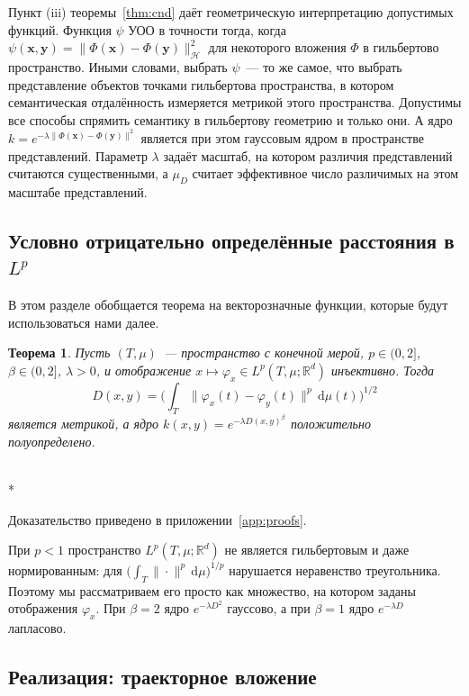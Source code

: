 \documentclass[14pt, a4paper]{extarticle}
\makeatletter
\theoremstyle{definition}
\theoremstyle{plain}
\newtheorem{theorem}[definition]{Теорема}
\renewenvironment{proof}[1][\proofname]{\par
    \pushQED{\qed}%
    \normalfont \topsep6\p@\@plus6\p@\relax
    \trivlist
    \item[\hskip\labelsep\itshape #1\@addpunct{.}]\mbox{}\\*
    \ignorespaces
}{\popQED\endtrivlist\@endpefalse}
\makeatother
\begin{document}
Пункт (iii) теоремы~\ref{thm:cnd} даёт геометрическую интерпретацию допустимых
функций. Функция $\psi$ УОО в точности тогда, когда
$\psi(\mathbf{x},\mathbf{y})=\|\Phi(\mathbf{x})-\Phi(\mathbf{y})\|_{\mathcal{H}}^2$
для некоторого вложения $\Phi$ в гильбертово пространство. Иными словами, выбрать
$\psi$~--- то же самое, что выбрать представление объектов точками гильбертова
пространства, в котором семантическая отдалённость измеряется метрикой этого
пространства. Допустимы все способы спрямить семантику в гильбертову геометрию и
только они. А ядро $k=e^{-\lambda\|\Phi(\mathbf{x})-\Phi(\mathbf{y})\|^2}$ является
при этом гауссовым ядром в пространстве представлений. Параметр $\lambda$ задаёт
масштаб, на котором различия представлений считаются существенными, а $\mu_D$
считает эффективное число различимых на этом масштабе представлений.

\subsection{Условно отрицательно определённые расстояния в \texorpdfstring{$L^p$}{Lp}}
\label{ssec:lp}

В этом разделе обобщается теорема \cite{AlpayMayats2023} на векторозначные
функции, которые будут использоваться нами далее.

\begin{theorem}
\label{thm:lp}
Пусть $(T,\mu)$~--- пространство с конечной мерой, $p\in(0,2]$, $\beta\in(0,2]$, $\lambda>0$, и
отображение $x\mapsto\varphi_x\in L^p(T,\mu;\mathbb{R}^d)$ инъективно. Тогда
\[
    D(x,y)=\Big(\int_T\|\varphi_x(t)-\varphi_y(t)\|^{p}\,\mathrm{d}\mu(t)\Big)^{1/2}
\]
является метрикой, а ядро $k(x,y)=e^{-\lambda D(x,y)^{\beta}}$ положительно
полуопределено.
\end{theorem}

\begin{proof}
Доказательство приведено в приложении~\ref{app:proofs}.
\end{proof}

При $p<1$ пространство $L^p(T,\mu;\mathbb{R}^d)$ не является гильбертовым и даже
нормированным: для $\big(\int_T\|\cdot\|^{p}\,\mathrm{d}\mu\big)^{1/p}$ нарушается неравенство
треугольника. Поэтому мы рассматриваем его просто как множество, на котором заданы
отображения $\varphi_x$. При $\beta=2$ ядро $e^{-\lambda D^2}$ гауссово, а при $\beta=1$
ядро $e^{-\lambda D}$ лапласово.




\subsection{Реализация: траекторное вложение}
\label{ssec:traj}
\end{document}
